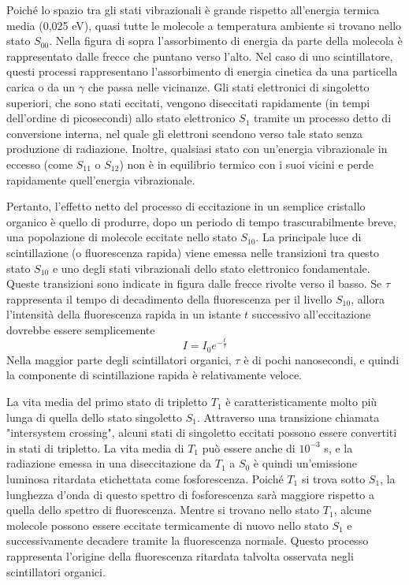 Poiché lo spazio tra gli stati vibrazionali è grande rispetto all'energia termica media (0,025 eV), quasi tutte le molecole a temperatura ambiente si trovano nello stato $S_{00}$. Nella figura di sopra l'assorbimento di energia da parte della molecola è rappresentato dalle frecce che puntano verso l'alto. Nel caso di uno scintillatore, questi processi rappresentano l'assorbimento di energia cinetica da una particella carica o da un $\gamma$ che passa nelle vicinanze. Gli stati elettronici di singoletto superiori, che sono stati eccitati, vengono diseccitati rapidamente (in tempi dell'ordine di picosecondi) allo stato elettronico $S_1$ tramite un processo detto di conversione interna, nel quale gli elettroni scendono verso tale stato senza produzione di radiazione. Inoltre, qualsiasi stato con un'energia vibrazionale in eccesso (come $S_{11}$ o $S_{12}$) non è in equilibrio termico con i suoi vicini e perde rapidamente quell'energia vibrazionale.

Pertanto, l'effetto netto del processo di eccitazione in un semplice cristallo organico è quello di produrre, dopo un periodo di tempo trascurabilmente breve, una popolazione di molecole eccitate nello stato $S_{10}$. La principale luce di scintillazione (o fluorescenza rapida) viene emessa nelle transizioni tra questo stato $S_{10}$ e uno degli stati vibrazionali dello stato elettronico fondamentale. Queste transizioni sono indicate in figura dalle frecce rivolte verso il basso. Se $\tau$ rappresenta il tempo di decadimento della fluorescenza per il livello $S_{10}$, allora l'intensità della fluorescenza rapida in un istante $t$ successivo all'eccitazione dovrebbe essere semplicemente
\begin{equation*}
   I=I_0 e^{-\frac{t}{\tau}}
\end{equation*}
Nella maggior parte degli scintillatori organici, $\tau$ è di pochi nanosecondi, e quindi la componente di scintillazione rapida è relativamente veloce.

La vita media del primo stato di tripletto $T_1$ è caratteristicamente molto più lunga di quella dello stato singoletto $S_1$. Attraverso una transizione chiamata "intersystem crossing", alcuni stati di singoletto eccitati possono essere convertiti in stati di tripletto. La vita media di $T_1$ può essere anche di $10^{-3}$ s, e la radiazione emessa in una diseccitazione da $T_1$ a $S_0$ è quindi un'emissione luminosa ritardata etichettata come fosforescenza. Poiché $T_1$ si trova sotto $S_1$, la lunghezza d'onda di questo spettro di fosforescenza sarà maggiore rispetto a quella dello spettro di fluorescenza. Mentre si trovano nello stato $T_1$, alcune molecole possono essere eccitate termicamente di nuovo nello stato $S_1$ e successivamente decadere tramite la fluorescenza normale. Questo processo rappresenta l'origine della fluorescenza ritardata talvolta osservata negli scintillatori organici.

